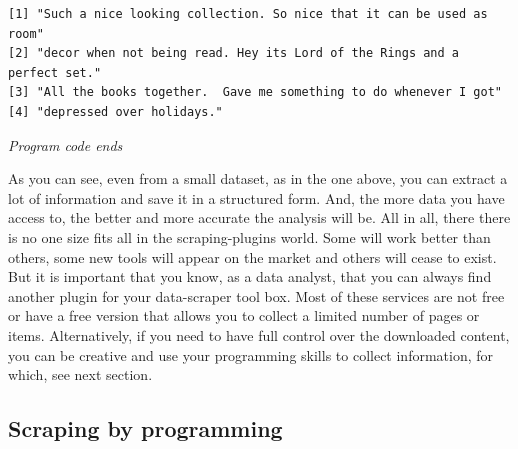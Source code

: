 \begin{Shaded}
\begin{Highlighting}[]
\SpecialCharTok{$}\NormalTok{)}
\end{Highlighting}
\end{Shaded}

\begin{verbatim}
[1] "Such a nice looking collection. So nice that it can be used as room"    
[2] "decor when not being read. Hey its Lord of the Rings and a perfect set."
[3] "All the books together.  Gave me something to do whenever I got"        
[4] "depressed over holidays."                                               
\end{verbatim}

\emph{Program code ends}

As you can see, even from a small dataset, as in the one above, you can
extract a lot of information and save it in a structured form. And,
the more data you have access to, the better and more accurate the analysis will be. All in
all, there there is no one size fits all in the scraping-plugins world.
Some will work better than others, some new tools will appear on the market and others will cease to exist. But it is important that you
know, as a data analyst, that you can always find another plugin for your data-scraper tool box. Most of these services are not free or have a free version that
allows you to collect a limited number of pages or items. Alternatively,
if you need to have full control over the downloaded content, you can be
creative and use your programming skills to collect information, for which, see
next section.

\subsection{Scraping by programming}\label{scraping-by-programming}

